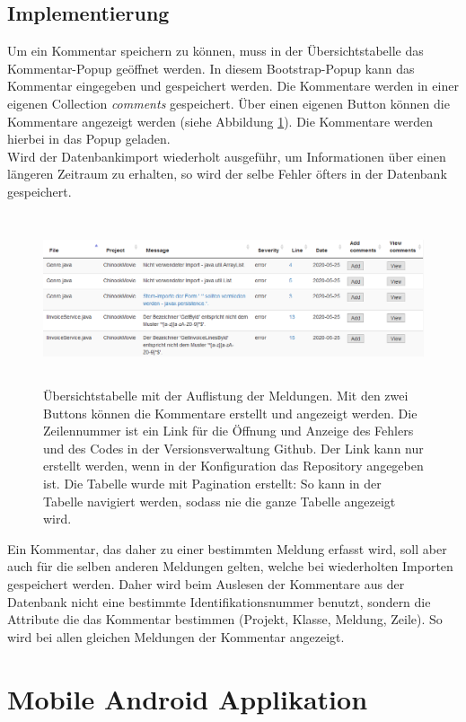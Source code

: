 \subsection{Implementierung}
Um ein Kommentar speichern zu können, muss in der Übersichtstabelle das Kommentar-Popup geöffnet werden. In diesem Bootstrap-Popup kann das Kommentar eingegeben und gespeichert werden. Die Kommentare werden in einer eigenen Collection \textit{comments} gespeichert. Über einen eigenen Button können die Kommentare angezeigt werden (siehe Abbildung \ref{fig:popup}). Die Kommentare werden hierbei in das Popup geladen. \\ Wird der Datenbankimport wiederholt ausgeführ, um Informationen über einen längeren Zeitraum zu erhalten, so wird der selbe Fehler öfters in der Datenbank gespeichert.
\begin{figure}[tp]
  \centering
  \includegraphics[height=5cm]{images/table.PNG}
 \caption[Übersichtstabelle]{Übersichtstabelle mit der Auflistung der Meldungen. Mit den zwei Buttons können die Kommentare erstellt und angezeigt werden. Die Zeilennummer ist ein Link für die Öffnung und Anzeige des Fehlers und des Codes in der Versionsverwaltung Github. Der Link kann nur erstellt werden, wenn in der Konfiguration das Repository angegeben ist. Die Tabelle wurde mit Pagination erstellt: So kann in der Tabelle navigiert werden, sodass nie die ganze Tabelle angezeigt wird. }
  \label{fig:popup}
\end{figure}
Ein Kommentar, das daher zu einer bestimmten Meldung erfasst wird, soll aber auch für die selben anderen Meldungen gelten, welche bei wiederholten Importen gespeichert werden. Daher wird beim Auslesen der Kommentare aus der Datenbank nicht eine bestimmte Identifikationsnummer benutzt, sondern die Attribute die das Kommentar bestimmen (Projekt, Klasse, Meldung, Zeile). So wird bei allen gleichen Meldungen der Kommentar angezeigt.
\section{Mobile Android Applikation}
